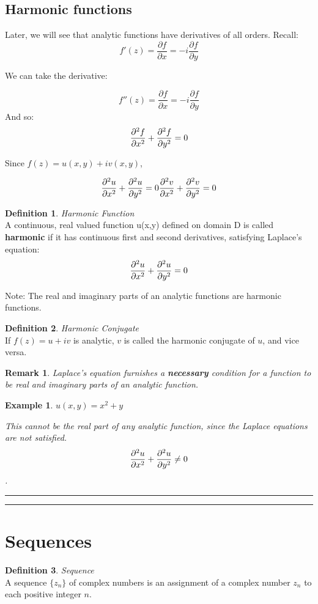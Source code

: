 \documentclass{article}
\newtheorem{ex}{Example}
\newtheorem*{remark}{Remark}
\theoremstyle{definition}
\newtheorem{definition}{Definition}[section]
\newcommand{\Section}[1]{\hrule\hrule\section{#1}}
\newcommand{\Def}[2]{
\begin{shaded*}
\begin{definition}{\textit{#1}}\\#2\end{definition}
\end{shaded*}
}
\begin{document}
\subsection{Harmonic functions}
Later, we will see that analytic functions have derivatives of all orders. Recall:
$$f'(z) = \frac{\partial f}{\partial x} = -i \frac{\partial f}{\partial y}$$

We can take the derivative:

$$f''(z) = \frac{\partial f}{\partial x} = -i \frac{\partial f}{\partial y}$$
And so:
$$\pdv{^2f}{x^2} + \pdv{^2f}{y^2} = 0$$

Since $f(z) = u(x,y) + i v(x,y)$, 

$$\pdv{^2u}{x^2} + \pdv{^2u}{y^2} = 0 \pdv{^2v}{x^2} + \pdv{^2v}{y^2} = 0$$

\Def{Harmonic Function}{ A continuous, real valued function u(x,y) defined on domain D is called \textbf{harmonic} if it has continuous first and second derivatives, satisfying Laplace's equation:
$$\pdv{^2u}{x^2} + \pdv{^2u}{y^2} = 0$$ 

Note: The real and imaginary parts of an analytic functions are harmonic functions.}

\Def{Harmonic Conjugate}{If $f(z) = u + iv$ is analytic, $v$ is called the harmonic conjugate of $u$, and vice versa.}

\begin{remark}
Laplace's equation furnishes a \textbf{necessary} condition for a function to be real and imaginary parts of an analytic function.
\end{remark}

\begin{ex}
$u(x,y) = x^2+y$

This cannot be the real part of any analytic function, since the Laplace equations are not satisfied. $$\pdv{^2u}{x^2} + \pdv{^2u}{y^2} \neq 0 $$.
\end{ex}

\Section{Sequences}
\Def{Sequence}{ A sequence $\{z_n\}$ of complex numbers is an assignment of a complex number $z_n$ to each positive integer $n$.}
\end{document}
